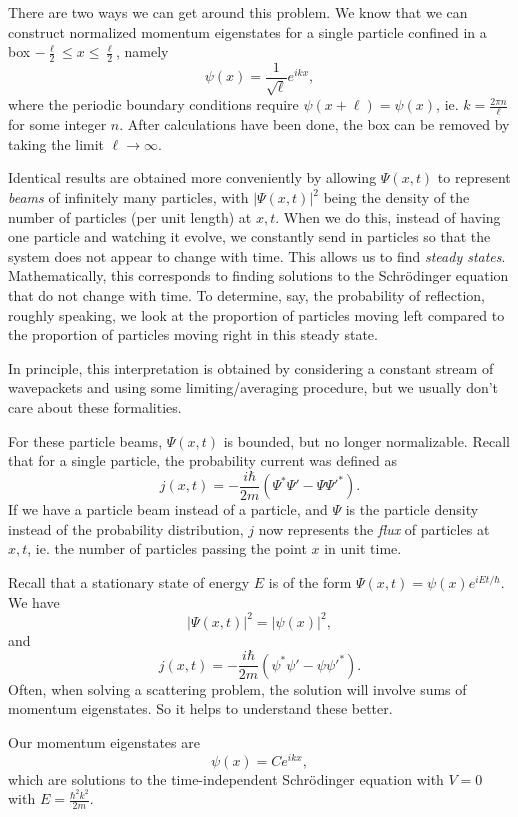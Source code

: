 \documentclass[a4paper]{article}
\begin{document}
There are two ways we can get around this problem. We know that we can construct normalized momentum eigenstates for a single particle confined in a box $-\frac{\ell}{2} \leq x \leq \frac{\ell}{2}$, namely
\[
  \psi(x) = \frac{1}{\sqrt{\ell}} e^{ikx},
\]
where the periodic boundary conditions require $\psi(x + \ell) = \psi(x)$, ie. $k = \frac{2\pi n}{\ell}$ for some integer $n$. After calculations have been done, the box can be removed by taking the limit $\ell \to \infty$.

Identical results are obtained more conveniently by allowing $\Psi(x, t)$ to represent \emph{beams} of infinitely many particles, with $|\Psi(x, t)|^2$ being the density of the number of particles (per unit length) at $x, t$. When we do this, instead of having one particle and watching it evolve, we constantly send in particles so that the system does not appear to change with time. This allows us to find \emph{steady states}. Mathematically, this corresponds to finding solutions to the Schr\"odinger equation that do not change with time. To determine, say, the probability of reflection, roughly speaking, we look at the proportion of particles moving left compared to the proportion of particles moving right in this steady state.

In principle, this interpretation is obtained by considering a constant stream of wavepackets and using some limiting/averaging procedure, but we usually don't care about these formalities.

For these particle beams, $\Psi(x, t)$ is bounded, but no longer normalizable. Recall that for a single particle, the probability current was defined as
\[
  j(x, t) = -\frac{i\hbar}{2m}(\Psi^* \Psi' - \Psi \Psi'^*).
\]
If we have a particle beam instead of a particle, and $\Psi$ is the particle density instead of the probability distribution, $j$ now represents the \emph{flux} of particles at $x, t$, ie. the number of particles passing the point $x$ in unit time.

Recall that a stationary state of energy $E$ is of the form $\Psi(x, t) = \psi(x) e^{iEt/\hbar}$. We have
\[
  |\Psi(x, t)|^2 = |\psi(x)|^2,
\]
and
\[
  j(x, t) = -\frac{i\hbar}{2m}(\psi^* \psi' - \psi\psi'^*).
\]
Often, when solving a scattering problem, the solution will involve sums of momentum eigenstates. So it helps to understand these better.

Our momentum eigenstates are
\[
  \psi(x) = Ce^{ikx},
\]
which are solutions to the time-independent Schr\"odinger equation with $V = 0$ with $E = \frac{\hbar^2 k^2}{2m}$.
\end{document}
